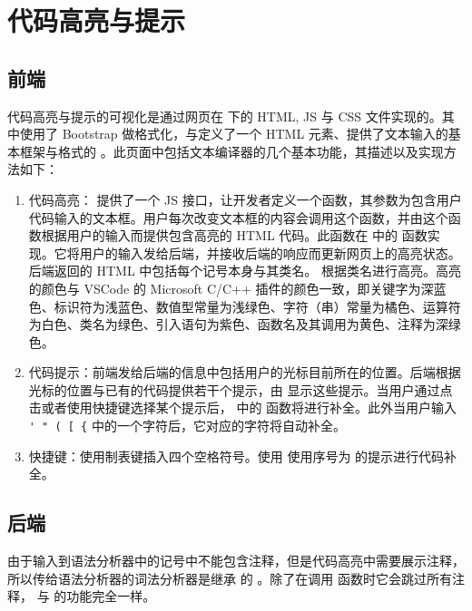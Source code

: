 \section{代码高亮与提示}

\subsection{前端}

代码高亮与提示的可视化是通过网页在  下的 HTML, JS 与 CSS 文件实现的。其中使用了 Bootstrap 做格式化，与定义了一个 HTML 元素、提供了文本输入的基本框架与格式的 \href{https://github.com/WebCoder49/code-input}{} 。此页面中包括文本编译器的几个基本功能，其描述以及实现方法如下：

\begin{enumerate}
    \item 代码高亮： 提供了一个 JS 接口，让开发者定义一个函数，其参数为包含用户代码输入的文本框。用户每次改变文本框的内容会调用这个函数，并由这个函数根据用户的输入而提供包含高亮的 HTML 代码。此函数在  中的  函数实现。它将用户的输入发给后端，并接收后端的响应而更新网页上的高亮状态。后端返回的 HTML 中包括每个记号本身与其类名。 根据类名进行高亮。高亮的颜色与 VSCode 的 Microsoft C/C++ 插件的颜色一致，即关键字为深蓝色、标识符为浅蓝色、数值型常量为浅绿色、字符（串）常量为橘色、运算符为白色、类名为绿色、引入语句为紫色、函数名及其调用为黄色、注释为深绿色。
    \item 代码提示：前端发给后端的信息中包括用户的光标目前所在的位置。后端根据光标的位置与已有的代码提供若干个提示，由  显示这些提示。当用户通过点击或者使用快捷键选择某个提示后， 中的  函数将进行补全。此外当用户输入 \lstinline`' " ( [ {` 中的一个字符后，它对应的字符将自动补全。
    \item 快捷键：使用制表键插入四个空格符号。使用  使用序号为  的提示进行代码补全。
\end{enumerate}

\subsection{后端}

由于输入到语法分析器中的记号中不能包含注释，但是代码高亮中需要展示注释，所以传给语法分析器的词法分析器是继承  的 。除了在调用  函数时它会跳过所有注释， 与  的功能完全一样。

